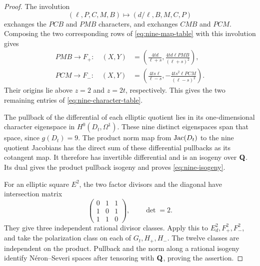 \begin{proof}
The involution
\begin{equation}\label{eq:nine-iota}
 (\ell,P,C,M,B)\longmapsto(d/\ell,B,M,C,P)
\end{equation}
exchanges the $PCB$ and $PMB$ characters, and exchanges $CMB$ and
$PCM$.  Composing the two corresponding rows of
\eqref{eq:nine-map-table} with this involution gives
\[
\begin{aligned}
 PMB\longrightarrow F_+:\quad (X,Y)
 &=\left(\frac{4td}{\ell+s},
           \frac{4td\ell PMB}{(\ell+s)^2}\right),\\
 PCM\longrightarrow F_-:\quad (X,Y)
 &=\left(\frac{4ts\ell}{\ell-s},
          -\frac{4ts^2\ell PCM}{(\ell-s)^2}\right).
\end{aligned}
\]
Their origins lie above $z=2$ and $z=2t$, respectively.  This gives
the two remaining entries of \eqref{eq:nine-character-table}.

The pullback of the differential of each elliptic quotient lies in its
one-dimensional character eigenspace in $H^0(D_t,\Omega^1)$.
These nine distinct eigenspaces span that space, since $g(D_t)=9$.
The product norm map from $\operatorname{Jac}(D_t)$ to the nine quotient
Jacobians has the direct sum of these differential pullbacks as its
cotangent map.  It therefore has invertible differential and is an
isogeny over $\mathbf Q$.  Its dual gives the product pullback isogeny and
proves \eqref{eq:nine-isogeny}.

For an elliptic square $E^2$, the two factor divisors and the diagonal
have intersection matrix
\[
 \begin{pmatrix}0&1&1\\1&0&1\\1&1&0\end{pmatrix},
 \qquad\det=2.
\]
They give three independent rational divisor classes.  Apply this to
$E_d^2,F_+^2,F_-^2$, and take the polarization class on each of
$G_t,H_+,H_-$.  The twelve classes are independent on the product.
Pullback and the norm along a rational isogeny identify N\'eron--Severi
spaces after tensoring with $\mathbf Q$, proving the assertion.
\end{proof}

